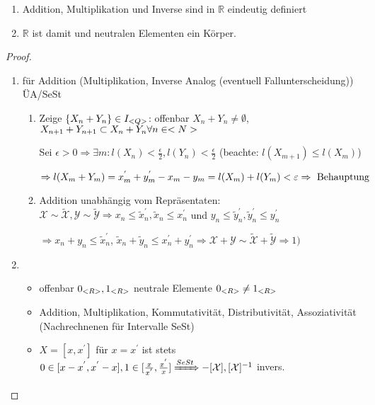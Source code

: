 \begin{proposition}
	\begin{enumerate}[label={\arabic*)}]
		\item Addition, Multiplikation und Inverse sind in $\mathbb{R}$ eindeutig definiert
		\item $\mathbb{R}$ ist damit und neutralen Elementen ein Körper.
	\end{enumerate}
\end{proposition}

\begin{proof}
	\begin{enumerate}[label={\arabic*)}]
		\item für Addition (Multiplikation, Inverse Analog (eventuell Fallunterscheidung)) ÜA/SeSt
		\begin{enumerate}[label={\alph*)}]
			\item Zeige $\{X_n + Y_n\} \in I_{<Q>}$: offenbar $X_n + Y_n \neq \emptyset$, $X_{n+1} + Y_{n+1} \subset X_n + Y_n \forall n \in <N>$
			
			Sei $\epsilon > 0 \Rightarrow \exists m\colon l(X_n) < \frac{\epsilon}{2}, l(Y_n) <\frac{\epsilon}{2}$ (beachte: $l(X_{m+1}) \le l(X_m)$)
			
			$\Rightarrow l(X_m + Y_m) = x_m^{'} + y_m^{'} - x_m - y_m = l(X_m) + l(Y_m) < \varepsilon \Rightarrow \text{ Behauptung}$
			\item Addition unabhängig vom Repräsentaten: $\mathcal{X} \sim \tilde{\mathcal{X}}, \mathcal{Y}\sim \tilde{\mathcal{Y}} \Rightarrow x_n \le \tilde{x}_n^{'}, \tilde{x}_n \le x_n^{'}$ und $y_n \le \tilde{y}_n^{'}, \tilde{y}_n^{'} \le y_n^{'}$
			
			$\Rightarrow x_n + y_n \le \tilde{x}_n^{'}$, $\tilde{x}_n + \tilde{y}_n \le x_n^{'} + y_n^{'} \Rightarrow \mathcal{X} + \mathcal{Y} \sim \tilde{\mathcal{X}} + \tilde{\mathcal{Y}} \Rightarrow 1)$
		\end{enumerate}
		\item 
		\begin{itemize}
			\item offenbar $0_{<R>}, 1_{<R>}$ neutrale Elemente $0_{<R>} \neq 1_{<R>}$
			\item Addition, Multiplikation, Kommutativität, Distributivität, Assoziativität (Nachrechnenen für Intervalle SeSt)
			\item $X = [x,x^{'}]$ für $x=x^{'}$ ist stets $0 \in [x-x^{'}, x^{'}-x], 1\in [\frac{x}{x^{'}}, \frac{x^{'}}{x}] \xRightarrow{SeSt} -[\mathcal{X}], [\mathcal{X}]^{-1}$ invers.
		\end{itemize}
	\end{enumerate}
\end{proof}

